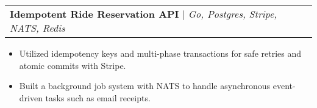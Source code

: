 \documentclass[letterpaper,11pt]{article}
\makeatletter
\newcommand{\resumeItem}[1]{
  \item\small{
    {#1 \vspace{-2pt}}
  }
}
\newcommand{\resumeProjectHeading}[2]{
    \item
    \begin{tabular*}{0.97\textwidth}{l@{\extracolsep{\fill}}r}
      \small#1 & #2 \\
    \end{tabular*}\vspace{-7pt}
}
\newcommand{\resumeItemListStart}{\begin{itemize}}
\newcommand{\resumeItemListEnd}{\end{itemize}\vspace{-5pt}}
\makeatother
\begin{document}
            



        \resumeProjectHeading
        {\textbf{Idempotent Ride Reservation API} $|$ \emph{Go, Postgres, Stripe, NATS, Redis}}{}
        \resumeItemListStart
            \resumeItem{Utilized idempotency keys and multi-phase transactions for safe retries and atomic commits with Stripe.}
            \resumeItem{Built a background job system with NATS to handle asynchronous event-driven tasks such as email receipts.}
        \resumeItemListEnd

  
\end{document}
